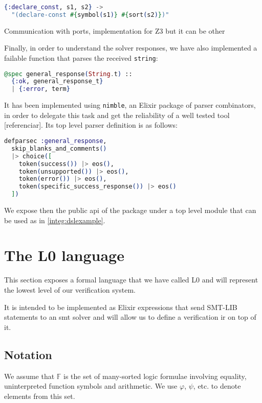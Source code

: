 \begin{lstlisting}[language=elixir,numbers=none,frame=none]
{:declare_const, s1, s2} ->
  "(declare-const #{symbol(s1)} #{sort(s2)})"
\end{lstlisting}

Communication with ports, implementation for Z3 but it can be other

Finally, in order to understand the solver responses, we have also implemented
a failable function that parses the received \verb|string|:

\begin{lstlisting}[language=elixir,numbers=none,frame=none]
@spec general_response(String.t) :: 
  {:ok, general_response_t} 
  | {:error, term}
\end{lstlisting}

It has been implemented using \verb|nimble|, an Elixir package of parser
combinators, in order to delegate this task and get the reliability of a well
tested tool [referenciar]. Its top level parser definition is as follows:

\begin{lstlisting}[language=elixir,numbers=none,frame=none]
defparsec :general_response,
  skip_blanks_and_comments()
  |> choice([
    token(success()) |> eos(),
    token(unsupported()) |> eos(),
    token(error()) |> eos(),
    token(specific_success_response()) |> eos()
  ])
\end{lstlisting}

We expose then the public \gls{api} of the package under a top level module
that can be used as in \ref{integ:dslexample}.

\section{The L0 language}

This section exposes a formal language that we have called L0 and will
represent the lowest level of our verification system.

It is intended to be implemented as Elixir expressions that send SMT-LIB 
statements to an \acrshort{smt} solver and will allow us to define a
verification \gls{ir} on top of it.

\subsection{Notation}

We assume that $\mathbb{F}$ is the set of many-sorted logic formulae involving
equality, uninterpreted function symbols and arithmetic. We use $\varphi$, 
$\psi$, etc. to denote elements from this set.

